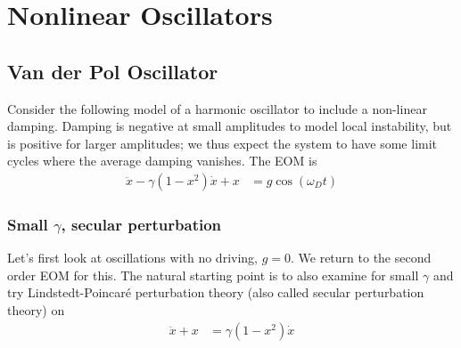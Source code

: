 \documentclass[12pt]{article}
\begin{document}
\clearpage

\section{Nonlinear Oscillators}

\subsection{Van der Pol Oscillator}

Consider the following model of a harmonic oscillator to include a non-linear
damping. Damping is negative at small amplitudes to model local instability,
but is positive for larger amplitudes; we thus expect the system to have some
limit cycles where the average damping vanishes. The EOM is
\begin{align}
    \ddot{x} - \gamma(1-x^2)\dot{x} + x &= g\cos(\omega_D t)
\end{align}

\subsubsection{Small $\gamma$, secular perturbation}

Let's first look at oscillations with no driving, $g=0$. We return to the
second order EOM for this. The natural starting point is to also examine for
small $\gamma$ and try Lindstedt-Poincar\'e perturbation theory (also called
secular perturbation theory) on
\begin{align}
    \ddot{x} + x &= \gamma(1-x^2)\dot{x}
\end{align}
\end{document}
